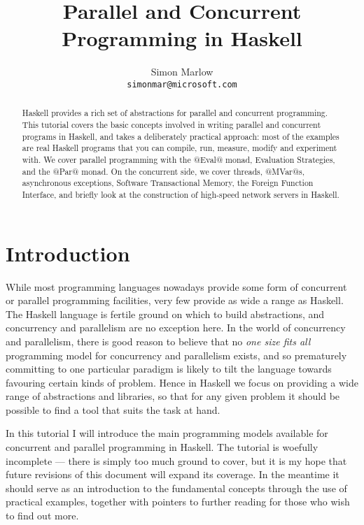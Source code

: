 \documentclass{llncs}
\title{Parallel and Concurrent Programming in Haskell}
\author{Simon Marlow\\\texttt{simonmar@microsoft.com}}
\institute{Microsoft Research Ltd., Cambridge, U.K.}
\date{}
\newcommand{\Section}[2]{\section{#2}\label{sec:#1}}
\begin{document}
\maketitle
\makeatactive



\begin{abstract}
Haskell provides a rich set of abstractions for parallel and
concurrent programming.  This tutorial covers the basic concepts
involved in writing parallel and concurrent programs in Haskell, and
takes a deliberately practical approach: most of the examples are real
Haskell programs that you can compile, run, measure, modify and
experiment with.  We cover parallel programming with the @Eval@ monad,
Evaluation Strategies, and the @Par@ monad.  On the concurrent side,
we cover threads, @MVar@s, asynchronous exceptions, Software
Transactional Memory, the Foreign Function Interface, and briefly look
at the construction of high-speed network servers in Haskell.
\end{abstract}

\Section{intro}{Introduction}

While most programming languages nowadays provide some form of
concurrent or parallel programming facilities, very few provide as
wide a range as Haskell.  The Haskell language is fertile ground on
which to build abstractions, and concurrency and parallelism are no
exception here.  In the world of concurrency and parallelism, there is
good reason to believe that no \emph{one size fits all} programming
model for concurrency and parallelism exists, and so prematurely
committing to one particular paradigm is likely to tilt the language
towards favouring certain kinds of problem.  Hence in Haskell we focus
on providing a wide range of abstractions and libraries, so that for
any given problem it should be possible to find a tool that suits the
task at hand.

In this tutorial I will introduce the main programming models
available for concurrent and parallel programming in Haskell.  The
tutorial is woefully incomplete --- there is simply too much ground to
cover, but it is my hope that future revisions of this document will
expand its coverage.  In the meantime it should serve as an
introduction to the fundamental concepts through the use of practical
examples, together with pointers to further reading for those who wish
to find out more.
\end{document}
